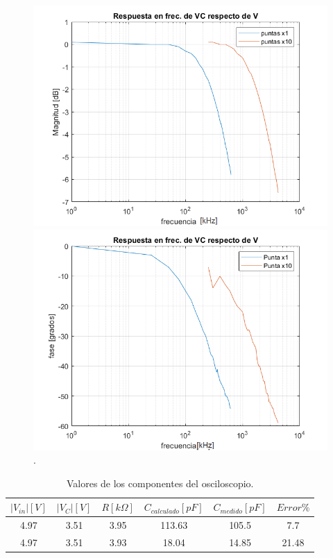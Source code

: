 \begin{figure}[H]
\centering
\begin{minipage}{.5\textwidth}
\includegraphics[scale=0.45]{1-8a.png}
\end{minipage}%
\begin{minipage}{.5\textwidth}
\includegraphics[scale=0.45]{1-8b.png}
\end{minipage}
\caption{.}
\label{puntas}
\end{figure}



\begin{table}[!htb]
\centering
\begin{tabular}{|c|c|c|c|c|c|}
\hline 
$|V_{in}|[V]$ & $|V_{C}|[V]$ & $R[k\Omega]$ & $C_{calculado}[pF]$ & $C_{medido}[pF]$ & $Error\%$\\
\hline 
\hline 
4.97 & 3.51 & 3.95 & 113.63 & 105.5 & 7.7\\
\hline 
4.97 & 3.51 & 3.93 & 18.04 & 14.85 & 21.48\\
\hline 
\end{tabular}
\caption{Valores de los componentes del osciloscopio.}
\label{tablaOsc}
\end{table}


